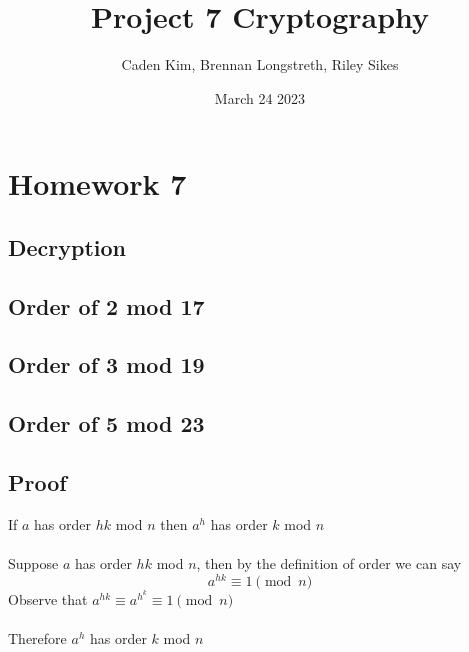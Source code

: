 \documentclass{article}
\title{Project 7 Cryptography}
\author{Caden Kim, Brennan Longstreth, Riley Sikes }
\date{March 24 2023}
\begin{document}
\maketitle

\section{Homework 7}

\subsection{Decryption}

\subsection{Order of 2 mod 17}

\subsection{Order of 3 mod 19}

\subsection{Order of 5 mod 23}

\subsection{Proof}
If $a$ has order $hk$ mod $n$ then $a^{h}$ has order $k$ mod $n$
\\\\
Suppose $a$ has order $hk$ mod $n$, then by the definition of order we can say
$$a^{hk} \equiv 1 \pmod{n}$$
Observe that $a^{hk} \equiv a^{h^{k}} \equiv 1 \pmod{n}$
\\\\
Therefore $a^{h}$ has order $k$ mod $n$
\end{document}
